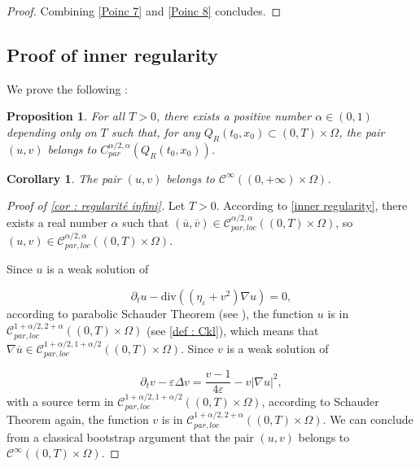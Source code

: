 \documentclass[reqno,12pt,twoside]{amsart}
\newtheorem{proposition}{Proposition}[section]
\newtheorem{corollary}{Corollary}[section]
\numberwithin{equation}{section} \numberwithin{theorem}{section}
\numberwithin{proposition}{section} \numberwithin{lemma}{section}
\numberwithin{corollary}{section}
\numberwithin{definition}{section} \numberwithin{remark}{section}
\begin{document}
\begin{proof}
Combining \eqref{Poinc 7} and \eqref{Poinc 8} concludes. 
\end{proof}

\subsection{Proof of inner regularity}

We prove the following : 
 
\begin{proposition}\label{inner regularity}
For all $T >0$, there exists a positive number $\alpha \in (0,1)$ depending only on $T$ such that, for any $Q_R(t_0, x_0)\subset (0,T) \times \Omega$, the pair $(u,v)$ belongs to $C_{par}^{\alpha/2,\alpha}(Q_R(t_0, x_0))$.
\end{proposition}

\begin{corollary}\label{cor : regularité infini}
The pair $(u, v)$ belongs to $\mathcal{C}^\infty ((0,+\infty) \times \Omega)$. 
\end{corollary}

\begin{proof}[Proof of \autoref{cor : regularité infini}]
Let $T >0$. According to \autoref{inner regularity}, there exists a real number $\alpha$ such that $(\overline{u}, \overline{v})\in \mathcal{C}_{par,loc}^{\alpha/2, \alpha} ((0,T) \times \Omega)$, so $(u,v)\in \mathcal{C}_{par,loc}^{\alpha/2, \alpha} ((0,T) \times \Omega)$. 

\smallskip

Since $u$ is a weak solution of 

\[\partial_t u - \text{div}((\eta_\varepsilon + v^2) \nabla u) = 0,\]
according to parabolic Schauder Theorem (see \cite[Theorem 8.11]{K96}), the function $u$ is in $\mathcal{C}_{par, loc}^{1 +\alpha/2, 2 +\alpha}((0,T)\times \Omega)$ (see \eqref{def : Ckl}), which means that $\nabla \overline{u} \in \mathcal{C}_{par, loc}^{1+ \alpha/2, 1 +\alpha/2}((0,T)\times \Omega)$. Since $v$ is a weak solution of 

\[\partial_t v - \varepsilon \Delta v = \frac{v-1}{4\varepsilon} - v|\nabla u|^2,\]
with a source term in $\mathcal{C}_{par, loc}^{1+ \alpha/2, 1 +\alpha/2}((0,T)\times \Omega)$, according to Schauder Theorem again, the function $v$ is in $\mathcal{C}_{par, loc}^{1 +\alpha/2, 2 +\alpha}((0,T)\times \Omega)$. We can conclude from a classical bootstrap argument that the pair $(u,v)$ belongs to $\mathcal{C}^\infty((0,T) \times \Omega)$. 
\end{proof}
\end{document}
